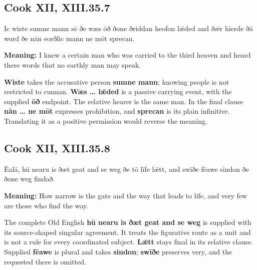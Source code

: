 \par\begin{minipage}{\linewidth}\raggedright
\subsection*{Cook XII, XIII.35.7}

Ic wiste sumne mann sē ðe wæs ōð ðone ðriddan heofon lǣded and ðǣr hīerde ðā word ðe nān eorðlic mann ne mōt sprecan.

\textbf{Meaning:} I knew a certain man who was carried to the third heaven and heard there words that no earthly man may speak.

\textbf{Wiste} takes the accusative person \textbf{sumne mann}; knowing people is not restricted to cunnan. \textbf{Wæs … lǣded} is a passive carrying event, with the supplied \textbf{ōð} endpoint. The relative hearer is the same man. In the final clause \textbf{nān … ne mōt} expresses prohibition, and \textbf{sprecan} is its plain infinitive. Translating it as a positive permission would reverse the meaning.

\end{minipage}\par\addvspace{4pt}

\par\begin{minipage}{\linewidth}\raggedright
\subsection*{Cook XII, XIII.35.8}

Ēalā, hū nearu is ðæt geat and se weg ðe tō līfe lǣtt, and swīðe fēawe sindon ðe ðone weg findað.

\textbf{Meaning:} How narrow is the gate and the way that leads to life, and very few are those who find the way.

The complete Old English \textbf{hū nearu is ðæt geat and se weg} is supplied with its source-shaped singular agreement. It treats the figurative route as a unit and is not a rule for every coordinated subject. \textbf{Lǣtt} stays final in its relative clause. Supplied \textbf{fēawe} is plural and takes \textbf{sindon}; \textbf{swīðe} preserves very, and the requested there is omitted.

\end{minipage}\par\addvspace{4pt}

